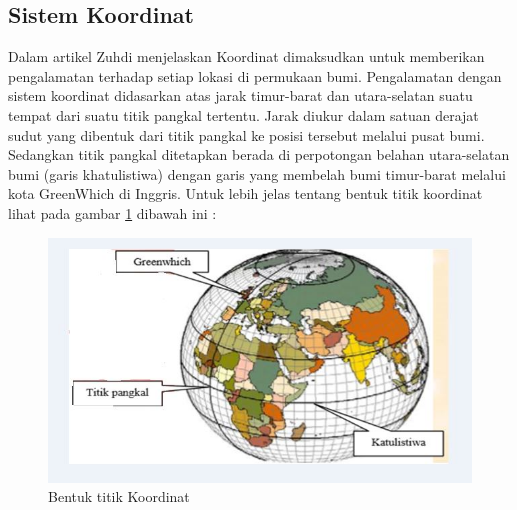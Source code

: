 \subsection{Sistem Koordinat}
Dalam artikel Zuhdi menjelaskan Koordinat dimaksudkan untuk memberikan pengalamatan terhadap setiap lokasi di permukaan bumi. Pengalamatan dengan sistem koordinat didasarkan atas jarak timur-barat dan utara-selatan suatu tempat dari suatu titik pangkal tertentu. Jarak diukur dalam satuan derajat sudut yang dibentuk dari titik pangkal ke posisi tersebut melalui pusat bumi. Sedangkan titik pangkal ditetapkan berada di perpotongan belahan utara-selatan bumi (garis khatulistiwa) dengan garis yang membelah bumi timur-barat melalui kota GreenWhich di Inggris. 
Untuk lebih jelas tentang bentuk titik koordinat lihat pada gambar \ref{sistemkoordinat} dibawah ini :
\begin{figure}[ht]
	\centerline{\includegraphics[width=1\textwidth]{figures/sistemkoordinat.JPG}}
	\caption{Bentuk titik Koordinat}
	\label{sistemkoordinat}
	\end{figure}

